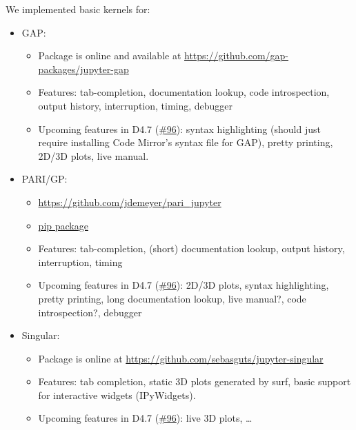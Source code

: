 We implemented basic kernels for:

\begin{itemize}
\tightlist
\item
  GAP:

  \begin{itemize}
  \tightlist
  \item
    Package is online and available at \url{https://github.com/gap-packages/jupyter-gap}
  \item
    Features: tab-completion, documentation lookup, code
    introspection, output history, interruption, timing, debugger
  \item
    Upcoming features in D4.7
    (\href{https://github.com/OpenDreamKit/OpenDreamKit/issues/96}{\#96}):
    syntax highlighting (should just require installing Code Mirror's
    syntax file for GAP), pretty printing, 2D/3D plots, live manual.
  \end{itemize}
\item
  PARI/GP:

  \begin{itemize}
  \tightlist
  \item
    \url{https://github.com/jdemeyer/pari_jupyter}
  \item
    \href{https://pypi.python.org/pypi/pari_jupyter}{pip
    package}
  \item
    Features: tab-completion, (short) documentation
    lookup, output history, interruption, timing
  \item
    Upcoming features in D4.7
    (\href{https://github.com/OpenDreamKit/OpenDreamKit/issues/96}{\#96}):
    2D/3D plots, syntax highlighting, pretty printing, long
    documentation lookup, live manual?, code introspection?, debugger
  \end{itemize}
\item
  Singular:

  \begin{itemize}
  \tightlist
  \item
    Package is online at \url{https://github.com/sebasguts/jupyter-singular}
  \item
    Features: tab completion, static 3D plots generated
    by surf, basic support for interactive widgets (IPyWidgets).
  \item
    Upcoming features in D4.7
    (\href{https://github.com/OpenDreamKit/OpenDreamKit/issues/96}{\#96}):
    live 3D plots, \ldots{}
  \end{itemize}
\end{itemize}

